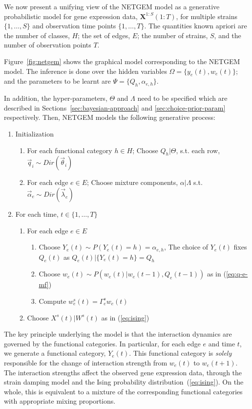 \documentclass{bioinfo}
\begin{document}
\begin{methods}
We now present a unifying view of the NETGEM model as a generative
probabilistic model for gene expression data,
${\mathbf X}^{1:S}(1:T)$, for multiple strains $\{1,\ldots,S\}$ and
observation time points $\{1, \ldots, T\}$.  The quantities known
apriori are the number of classes, $H$; the set of edges, $E$; the
number of strains, $S$, and the number of observation points $T$. 

Figure~\ref{fig:netgem} shows the graphical model corresponding to the
NETGEM model. The inference is done over the hidden variables $\Omega
= \{y_{e}(t), w_{e}(t)\}$; and the parameters to be learnt are $\Psi = \{Q_{h}, \alpha_{e,h}\}$.

In addition, the hyper-parameters, $\Theta$ and $\Lambda$ need to be
specified which are described in Sections~\ref{sec:bayesian-approach}
and \ref{sec:choice-prior-param} respectively. Then, NETGEM models the
following generative process:
\begin{enumerate}
\item Initialization 
  \begin{enumerate}
  \item For each functional category $h \in H$; Choose $Q_{h} | \Theta$,  s.t. each row, $\vec{q}_{i} \sim   Dir(\vec{\theta}_{i})$ 
  \item For each edge $e\in E$;  Choose mixture components, $\alpha | \Lambda$ s.t. $\vec{\alpha}_{e} \sim Dir(\vec{\lambda}_{e})$
  \end{enumerate}
\item For each time, $t \in \{1,\ldots, T\}$
  \begin{enumerate}
  \item For each edge $e \in E$
  \begin{enumerate}
  \item Choose $Y_{e}(t) \sim P(Y_{e}(t) = h) = \alpha_{e,h}$, The
    choice of $Y_{e}(t)$ fixes $Q_{e}(t)$ as $Q_{e}(t) | \{Y_{e}(t) = h\}  = Q_{h}$
  \item Choose $w_{e}(t) \sim P(w_{e}(t) | w_{e}(t-1), Q_{e}(t-1))$ as
    in (\ref{eq:q-e-mf})
  \item Compute $w_{e}^{s}(t) = \Gamma^{s}_{e} w_{e}(t)$
  \end{enumerate}
    \item Choose $X^{s}(t) | W^{s}(t) $ as in (\ref{eq:ising})
 \end{enumerate} 
\end{enumerate}
The key principle underlying the model is that the interaction dynamics are
governed by the functional categories. In particular, for each edge $e$ and time
$t$, we generate a functional category, $Y_{e}(t)$. This functional
category is \emph{solely} responsible for the change of interaction strength
from $w_{e}(t)$ to $w_{e}(t+1)$. The interaction strengths affect the
observed gene expression data, through the strain damping model and
the Ising probability distribution~(\ref{eq:ising}). On the whole, this is equivalent to a
mixture of the corresponding functional categories with appropriate
mixing proportions. 


\end{methods}
\end{document}
